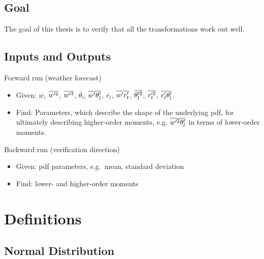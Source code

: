 \documentclass[10pt]{beamer}
\numberwithin{equation}{section}
\begin{document}
    \subsection{Goal}\label{subsec:goal}

    \begin{frame}
        The goal of this thesis is to verify that all the transformations work out well.
    \end{frame}

    \subsection{Inputs and Outputs}\label{subsec:inputs-and-outputs}

    \begin{frame}{Forward run (weather forecast)}
        \begin{itemize}
            [<+->]
            \item Given: $\overline{w}$, $\overline{w'^2}$, $\overline{w'^3}$, $\overline{\theta_l}$, $\overline{w' \theta_l'}$,
            $\overline{r_t}$, $\overline{w' r_t'}$, $\overline{\theta_l'^2}$, $\overline{r_t'^2}$, $\overline{r_t' \theta_l'}$.
            \item Find: Parameters, which describe the shape of the underlying pdf,
            for ultimately describing higher-order moments,
            e.g. $\overline{w'^2 \theta_l'}$ in terms of lower-order moments.
        \end{itemize}
    \end{frame}

    \begin{frame}{Backward run (verification direction)}
        \begin{itemize}
            [<+->]
            \item Given: pdf parameters, e.g.\ mean, standard deviation
            \item Find: lower- and higher-order moments
        \end{itemize}
    \end{frame}


    \section{Definitions}\label{sec:definitions}

    \subsection{Normal Distribution}\label{subsec:normal-distribution}
\end{document}
